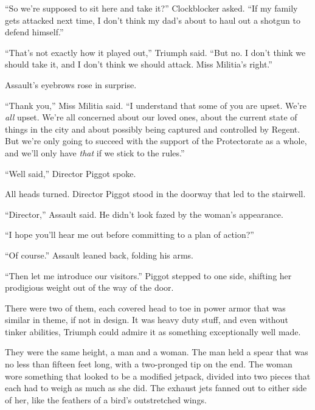 ``So we're supposed to sit here and take it?'' Clockblocker asked.  ``If my family gets attacked next time, I don't think my dad's about to haul out a shotgun to defend himself.''



``That's not exactly how it played out,'' Triumph said.  ``But no.  I don't think we should take it, and I don't think we should attack.  Miss Militia's right.''



Assault's eyebrows rose in surprise.



``Thank you,'' Miss Militia said.  ``I understand that some of you are upset.  We're \emph{all} upset.  We're all concerned about our loved ones, about the current state of things in the city and about possibly being captured and controlled by Regent.  But we're only going to succeed with the support of the Protectorate as a whole, and we'll only have \emph{that} if we stick to the rules.''



``Well said,'' Director Piggot spoke.



All heads turned.  Director Piggot stood in the doorway that led to the stairwell.



``Director,'' Assault said.  He didn't look fazed by the woman's appearance.



``I hope you'll hear me out before committing to a plan of action?''



``Of course.''  Assault leaned back, folding his arms.



``Then let me introduce our visitors.''  Piggot stepped to one side, shifting her prodigious weight out of the way of the door.



There were two of them, each covered head to toe in power armor that was similar in theme, if not in design.  It was heavy duty stuff, and even without tinker abilities, Triumph could admire it as something exceptionally well made.



They were the same height, a man and a woman.  The man held a spear that was no less than fifteen feet long, with a two-pronged tip on the end.  The woman wore something that looked to be  a modified jetpack, divided into two pieces that each had to weigh as much as she did.  The exhaust jets fanned out to either side of her, like the feathers of a bird's outstretched wings.



